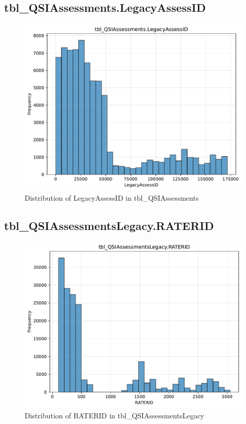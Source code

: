 \subsection{tbl\_QSIAssessments.LegacyAssessID}

\begin{figure}[htbp]
\centering
\includegraphics[width=\textwidth]{figures/dbo_tbl_QSIAssessments_LegacyAssessID.pdf}
\caption{Distribution of LegacyAssessID in tbl\_QSIAssessments}
\end{figure}\newpage

\subsection{tbl\_QSIAssessmentsLegacy.RATERID}

\begin{figure}[htbp]
\centering
\includegraphics[width=\textwidth]{figures/dbo_tbl_QSIAssessmentsLegacy_RATERID.pdf}
\caption{Distribution of RATERID in tbl\_QSIAssessmentsLegacy}
\end{figure}\newpage

